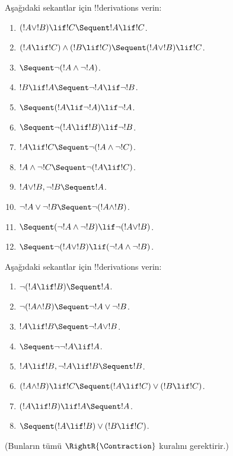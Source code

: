 \begin{prob}
Aşağıdaki sekantlar için !!{derivation}s verin:
\begin{enumerate}
\item $(!A \lor !B) \lif !C \Sequent !A \lif !C$.
\item $(!A \lif !C) \land (!B \lif !C) \Sequent (!A \lor !B) \lif !C$.
\item $\Sequent \lnot(!A \land \lnot !A)$.
\item $!B \lif !A \Sequent \lnot !A \lif \lnot !B$.
\item $\Sequent (!A \lif \lnot !A) \lif \lnot !A$.
\item $\Sequent \lnot(!A \lif !B) \lif \lnot !B$.
\item $!A \lif !C \Sequent \lnot (!A \land \lnot !C)$.
\item $!A \land \lnot !C \Sequent \lnot (!A \lif !C)$.
\item $!A \lor !B, \lnot !B \Sequent !A$.
\item $\lnot !A \lor \lnot !B \Sequent \lnot(!A \land !B)$.
\item $\Sequent (\lnot !A \land \lnot !B) \lif\lnot(!A \lor !B)$.
\item $\Sequent \lnot(!A \lor !B) \lif (\lnot !A \land \lnot !B)$.
\end{enumerate}
\end{prob}

\begin{prob}
Aşağıdaki sekantlar için !!{derivation}s verin:
\begin{enumerate}
\item $\lnot(!A \lif !B) \Sequent !A$.
\item $\lnot(!A \land !B) \Sequent \lnot !A \lor \lnot !B$.
\item $!A \lif !B \Sequent \lnot !A \lor !B$.
\item $\Sequent \lnot \lnot !A \lif !A$.
\item $!A \lif !B, \lnot !A \lif !B \Sequent !B$.
\item $(!A \land !B) \lif !C \Sequent (!A \lif !C) \lor (!B \lif !C)$.
\item $(!A \lif !B) \lif !A \Sequent !A$.
\item $\Sequent (!A \lif !B) \lor (!B \lif !C)$.
\end{enumerate}
(Bunların tümü $\RightR{\Contraction}$ kuralını gerektirir.)
\end{prob}
